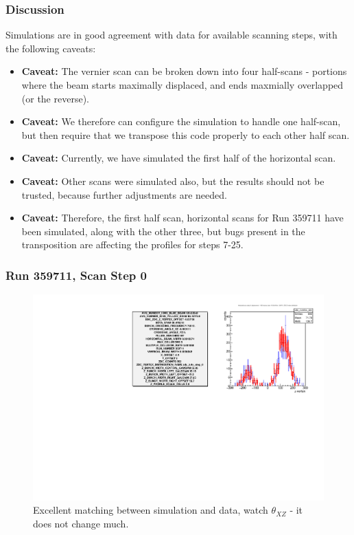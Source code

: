 \begin{frame}
\frametitle{Discussion}
Simulations are in good agreement with data for available scanning steps, with
the following caveats:
\begin{itemize}
	\item \textbf{Caveat:} The vernier scan can be broken down into four
		half-scans - portions where the beam starts maximally displaced, and ends
		maxmially overlapped (or the reverse).
	\item \textbf{Caveat:} We therefore can configure the simulation to handle
		one half-scan, but then require that we transpose this code properly to
		each other half scan.
\item \textbf{Caveat:} Currently, we have simulated the first half of the
	horizontal scan.
\item \textbf{Caveat:} Other scans were simulated also, but the results should
	not be trusted, because further adjustments are needed.
\item \textbf{Caveat:} Therefore, the first half scan, horizontal scans for Run
	359711 have been simulated, along with the other three, but bugs present in
	the transposition are affecting the profiles for steps 7-25.
\end{itemize}

\end{frame}


\begin{frame}
\frametitle{Run 359711, Scan Step 0}
\begin{figure}
\begin{center}
\includegraphics[width=\linewidth]{"figures/359711_step_0_zdc_zvertex"}
\caption{Excellent matching between simulation and data, watch $\theta_{XZ}$ - it does not change much.}
\label{fig:359711_step_0_zdc_zvertex}
\end{center}
\end{figure}
\end{frame}


